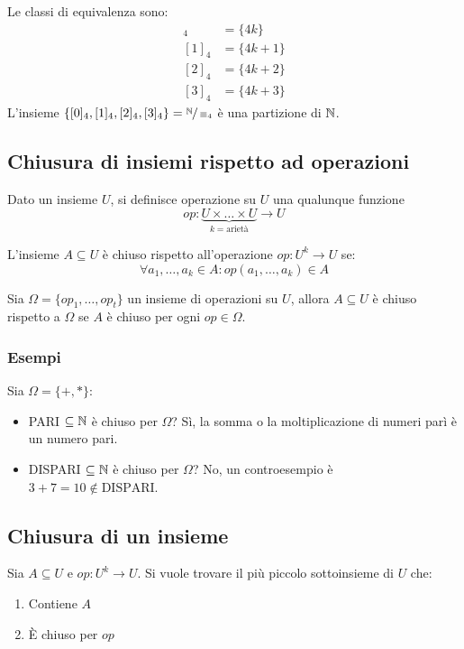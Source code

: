 Le classi di equivalenza sono:
\begin{align}
    [0]_4&=\{4k\}\tag{Multipli di 4}\\
    [1]_4&=\{4k+1\}\tag{Resto 1}\\
    [2]_4&=\{4k+2\}\tag{Resto 2}\\
    [3]_4&=\{4k+3\}\tag{Resto 3}
\end{align}
L'insieme $\{[0]_4,[1]_4,[2]_4,[3]_4\}=\sfrac{\mathbb{N}}{\equiv_4}$ è una partizione di $\mathbb{N}$.

\subsection*{Chiusura di insiemi rispetto ad operazioni}
Dato un insieme $U$, si definisce operazione su $U$ una qualunque funzione
$$ op: \underbrace{U\times\dots\times U}_{\displaystyle k=\text{arietà}}\to U $$

L'insieme $A\subseteq U$ è chiuso rispetto all'operazione $op:U^k\to U$ se:
$$ \forall a_1,\dots,a_k \in A : op(a_1,\dots,a_k)\in A $$

Sia $\Omega=\{op_1,\dots,op_t\}$ un insieme di operazioni su $U$, allora $A\subseteq U$
è chiuso rispetto a $\Omega$ se $A$ è chiuso per ogni $op\in\Omega$.

\subsubsection*{Esempi}
Sia $\Omega=\{+,*\}$:
\begin{itemize}
    \item PARI $\subseteq\mathbb{N}$ è chiuso per $\Omega$? Sì, la somma o la moltiplicazione di
        numeri parì è un numero pari.
    \item DISPARI $\subseteq\mathbb{N}$ è chiuso per $\Omega$? No, un controesempio è 
        $3+7=10\notin\text{DISPARI}$.
\end{itemize}

\subsection*{Chiusura di un insieme}

\begin{minipage}{.4\textwidth}
    Sia $A\subseteq U$ e $op:U^k\to U$. Si vuole trovare {\color{red}il più piccolo}
    sottoinsieme di $U$ che: \vspace{.2cm}
    \begin{enumerate}
        \setlength\itemsep{.5em}
        \item {\color{blue}Contiene $A$}
        \item {\color{blue}È chiuso per $op$}
    \end{enumerate}
\end{minipage}
\begin{minipage}{.55\textwidth}
    \begin{center}
        
    \end{center}
\end{minipage}
\vspace{.3cm}

